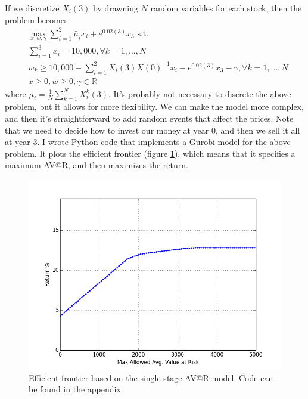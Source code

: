 \documentclass{amsart}
\theoremstyle{definition}
\theoremstyle{remark}
\begin{document}
If we discretize $X_i(3)$ by drawning $N$ random variables for each stock, then the problem becomes
\begin{align*}
&\max_{x,w,\gamma} \sum_{i=1}^2 \bar{\mu}_i x_i +  e^{0.02(3)} x_3 \text{ s.t.}\\
&\sum_{i=1}^3 x_i = 10,000,  \forall k = 1,\ldots, N\\
& w_k \ge 10,000 - \sum_{i=1}^2 X_i(3) X(0)^{-1} x_i - e^{0.02(3)} x_3 - \gamma, \forall k = 1,\ldots, N\\
&x \ge 0, w \ge 0, \gamma \in \mathbb{R}
\end{align*}
where $\bar{\mu}_i = \frac{1}{N} \sum_{k=1}^N X_i^k(3)$.
It's probably not necessary to discrete the above problem, but it allows for more flexibility. We can make the model more complex, and then it's straightforward to add random events that affect the prices. Note that we need to decide how to invest our money at year 0, and then we sell it all at year 3. I wrote Python code that implements a Gurobi model for the above problem. It plots the efficient frontier (figure \ref{fig:single_stage}), which means that it specifies a maximum AV@R, and then maximizes the return.
\begin{figure}
\centering
\includegraphics[scale=0.5]{single_stage.png}
\caption{Efficient frontier based on the single-stage AV@R model.  Code can be found in the appendix.}
\label{fig:single_stage}
\end{figure}
\end{document}
